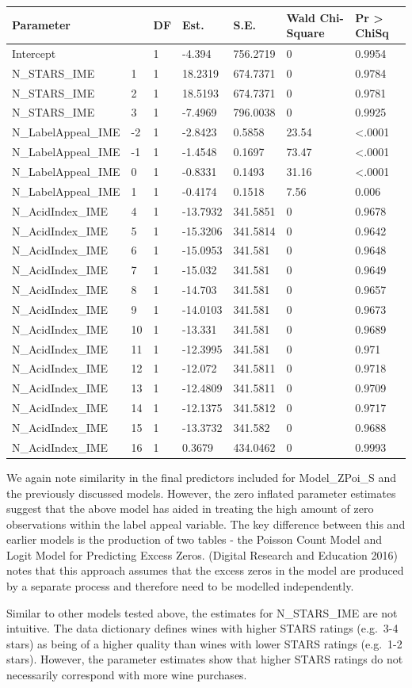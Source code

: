 \documentclass[]{article}
\begin{document}
\begin{longtable}[]{@{}lllllll@{}}
\toprule
Parameter & & DF & Est. & S.E. & Wald Chi-Square & Pr \textgreater{}
ChiSq\tabularnewline
\midrule
\endhead
Intercept & & 1 & -4.394 & 756.2719 & 0 & 0.9954\tabularnewline
N\_STARS\_IME & 1 & 1 & 18.2319 & 674.7371 & 0 & 0.9784\tabularnewline
N\_STARS\_IME & 2 & 1 & 18.5193 & 674.7371 & 0 & 0.9781\tabularnewline
N\_STARS\_IME & 3 & 1 & -7.4969 & 796.0038 & 0 & 0.9925\tabularnewline
N\_LabelAppeal\_IME & -2 & 1 & -2.8423 & 0.5858 & 23.54 &
\textless{}.0001\tabularnewline
N\_LabelAppeal\_IME & -1 & 1 & -1.4548 & 0.1697 & 73.47 &
\textless{}.0001\tabularnewline
N\_LabelAppeal\_IME & 0 & 1 & -0.8331 & 0.1493 & 31.16 &
\textless{}.0001\tabularnewline
N\_LabelAppeal\_IME & 1 & 1 & -0.4174 & 0.1518 & 7.56 &
0.006\tabularnewline
N\_AcidIndex\_IME & 4 & 1 & -13.7932 & 341.5851 & 0 &
0.9678\tabularnewline
N\_AcidIndex\_IME & 5 & 1 & -15.3206 & 341.5814 & 0 &
0.9642\tabularnewline
N\_AcidIndex\_IME & 6 & 1 & -15.0953 & 341.581 & 0 &
0.9648\tabularnewline
N\_AcidIndex\_IME & 7 & 1 & -15.032 & 341.581 & 0 &
0.9649\tabularnewline
N\_AcidIndex\_IME & 8 & 1 & -14.703 & 341.581 & 0 &
0.9657\tabularnewline
N\_AcidIndex\_IME & 9 & 1 & -14.0103 & 341.581 & 0 &
0.9673\tabularnewline
N\_AcidIndex\_IME & 10 & 1 & -13.331 & 341.581 & 0 &
0.9689\tabularnewline
N\_AcidIndex\_IME & 11 & 1 & -12.3995 & 341.581 & 0 &
0.971\tabularnewline
N\_AcidIndex\_IME & 12 & 1 & -12.072 & 341.5811 & 0 &
0.9718\tabularnewline
N\_AcidIndex\_IME & 13 & 1 & -12.4809 & 341.5811 & 0 &
0.9709\tabularnewline
N\_AcidIndex\_IME & 14 & 1 & -12.1375 & 341.5812 & 0 &
0.9717\tabularnewline
N\_AcidIndex\_IME & 15 & 1 & -13.3732 & 341.582 & 0 &
0.9688\tabularnewline
N\_AcidIndex\_IME & 16 & 1 & 0.3679 & 434.0462 & 0 &
0.9993\tabularnewline
\bottomrule
\end{longtable}

We again note similarity in the final predictors included for
Model\_ZPoi\_S and the previously discussed models. However, the zero
inflated parameter estimates suggest that the above model has aided in
treating the high amount of zero observations within the label appeal
variable. The key difference between this and earlier models is the
production of two tables - the Poisson Count Model and Logit Model for
Predicting Excess Zeros. (Digital Research and Education 2016) notes
that this approach assumes that the excess zeros in the model are
produced by a separate process and therefore need to be modelled
independently.

Similar to other models tested above, the estimates for N\_STARS\_IME
are not intuitive. The data dictionary defines wines with higher STARS
ratings (e.g.~3-4 stars) as being of a higher quality than wines with
lower STARS ratings (e.g.~1-2 stars). However, the parameter estimates
show that higher STARS ratings do not necessarily correspond with more
wine purchases.
\end{document}
